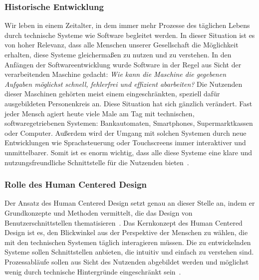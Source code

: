 \subsubsection{Historische Entwicklung}
Wir leben in einem Zeitalter, in dem immer mehr Prozesse des täglichen Lebens
durch technische Systeme wie Software begleitet werden. In dieser Situation ist
es von hoher Relevanz, dass alle Menschen unserer Gesellschaft die Möglichkeit
erhalten, diese Systeme gleichermaßen zu nutzen und zu verstehen. In den Anfängen
der Softwareentwicklung wurde Software in der Regel aus Sicht der
verarbeitenden Maschine gedacht: \textit{Wie kann die Maschine die gegebenen Aufgaben
möglichst schnell, fehlerfrei und effizient abarbeiten?} Die Nutzenden dieser
Maschinen gehörten meist einem eingeschränkten, speziell dafür ausgebildeten
Personenkreis an. Diese Situation hat sich gänzlich verändert. Fast jeder Mensch
agiert heute viele Male am Tag mit technischen, softwaregetriebenen Systemen:
Bankautomaten, Smartphones, Supermarktkassen oder Computer. Außerdem wird der
Umgang mit solchen Systemen durch neue Entwicklungen wie Sprachsteuerung oder
Touchscreens immer interaktiver und unmittelbarer. Somit ist es enorm wichtig,
dass alle diese Systeme eine klare und nutzungsfreundliche Schnittstelle für
die Nutzenden bieten~\cite{moserTesting}.

\subsubsection{Rolle des Human Centered Design}
Der Ansatz des Human Centered Design setzt genau an dieser Stelle an, indem er
Grundkonzepte und Methoden vermittelt, die das Design von
Benutzerschnittstellen thematisieren~\cite{hcd}. Das Kernkonzept des Human
Centered Design ist es, den Blickwinkel aus der Perspektive der Menschen zu
wählen, die mit den technischen Systemen täglich interagieren müssen. Die zu
entwickelnden Systeme sollen Schnittstellen anbieten, die intuitiv und einfach
zu verstehen sind. Prozessabläufe sollen aus Sicht des Nutzenden abgebildet
werden und möglichst wenig durch technische Hintergründe eingeschränkt
sein~\cite{HMI-HCD}.

